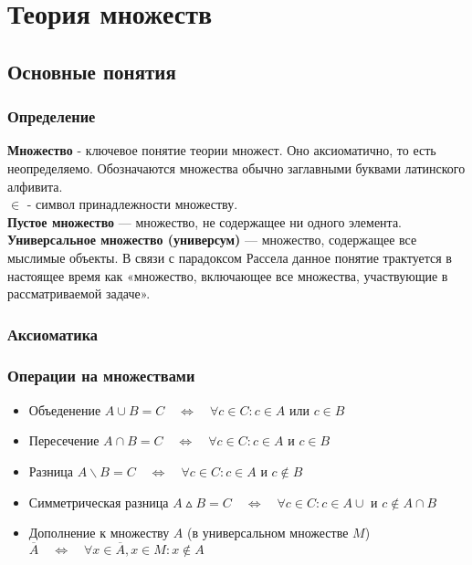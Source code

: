 \part{Теория множеств}             
\chapter{Основные понятия}
\section{Определение}
\textbf{Множество} - ключевое понятие теории множест. Оно аксиоматично, то есть неопределяемо. Обозначаются множества обычно заглавными буквами латинского алфивита.\\
 $\in$ - символ принадлежности множеству.\\
\textbf{Пустое множество} — множество, не содержащее ни одного элемента.\\
\textbf{Универсальное множество (универсум)} — множество, содержащее все мыслимые объекты. В связи с парадоксом Рассела данное понятие трактуется в настоящее время как «множество, включающее все множества, участвующие в рассматриваемой задаче».
\section{Аксиоматика}

\section{Операции на множествами}
\begin{itemize}
	\item Объеденение $A \cup B = C \quad \Leftrightarrow \quad \forall c \in C : c \in A \text{ или } c \in B$
	\item Пересечение $A \cap B = C \quad \Leftrightarrow \quad \forall c \in C : c \in A \text{ и } c \in B$
	\item Разница $A \backslash B = C \quad \Leftrightarrow \quad \forall c \in C : c \in A \text{ и } c \notin B$
	\item Симметрическая разница $A \vartriangle B = C \quad \Leftrightarrow \quad \forall c \in C : c \in A \cup \text{ и } c \notin A \cap B $
	\item Дополнение к множеству $A$ (в универсальном множестве  $M$) $\overline{A} \quad \Leftrightarrow \quad \forall x \in \overline{A}, x \in M : x \notin A$
\end{itemize}

